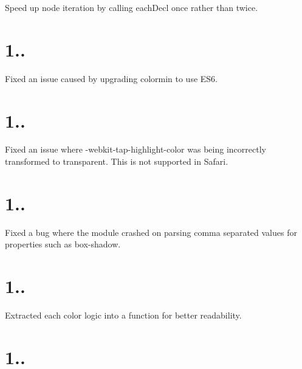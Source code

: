 \begin{DoxyItemize}
\item Speed up node iteration by calling {\ttfamily each\+Decl} once rather than twice.
\end{DoxyItemize}

\section*{1..}


\begin{DoxyItemize}
\item Fixed an issue caused by upgrading colormin to use E\+S6.
\end{DoxyItemize}

\section*{1..}


\begin{DoxyItemize}
\item Fixed an issue where {\ttfamily -\/webkit-\/tap-\/highlight-\/color} was being incorrectly transformed to {\ttfamily transparent}. This is not supported in Safari.
\end{DoxyItemize}

\section*{1..}


\begin{DoxyItemize}
\item Fixed a bug where the module crashed on parsing comma separated values for properties such as {\ttfamily box-\/shadow}.
\end{DoxyItemize}

\section*{1..}


\begin{DoxyItemize}
\item Extracted each color logic into a function for better readability.
\end{DoxyItemize}

\section*{1..}


